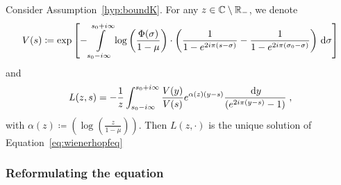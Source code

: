 \begin{theorem}
\label{th:SolutionWH}Consider Assumption~\ref{hyp:boundK}. 
For any $z \in \mathbb{C} \setminus \mathbb{R}_-$, we denote
\begin{equation}
    V(s) \coloneqq \exp \left[
        - \int\limits_{s_0-i\infty}^{s_0+i\infty}\log \left( \frac{\Phi(\sigma)}{1-\mu}\right)
        \cdot \left(
            \frac{1}{1-e^{2i\pi(s-\sigma)}} - \frac{1}{1-e^{2i\pi(\sigma_0-\sigma)}}
         \right) \,\mathrm{d} \sigma 
        \right]
        \label{def:V}
    \end{equation}
and 
\begin{equation}\label{eq:exprL}
    L(z,s) 
    = 
   - \frac{1}{z}\int_{s_0-i\infty}^{s_0+i\infty} \frac{V(y)}{V(s)} e^{ \alpha(z)(y-s)}
   \frac{\,\mathrm{d} y}{(e^{2i\pi(y-s)}-1)}
   \; ,
\end{equation}
with $\alpha(z) \coloneqq  
    \left(\log \left( \frac{z}{1-\mu}\right)\right)$.
Then $L(z,\cdot)$ is the unique solution of Equation~\eqref{eq:wienerhopfeq}
\end{theorem}

\subsubsection{Reformulating the equation}
\label{s:reformulate_eq}
\mbox{}

